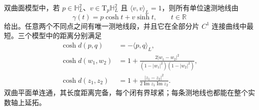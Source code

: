 \begin{theorem}
	\label{g1:thm:hyperbolic-distance-geodesics}
	双曲面模型中，若 \(p\in\mathbb H_L^2\)、\(v\in \mathrm{T}_p\mathbb H_L^2\) 且 \(\langle v,v\rangle_L=1\)，则所有单位速测地线由
	\begin{equation}
		\label{g1:eq:hyperboloid-geodesic}
		\gamma(t)=p\cosh t+v\sinh t,\qquad t\in\mathbb R
	\end{equation}
	给出。任意两个不同点之间有唯一测地线段，并且它在全部分片 \(C^1\) 连接曲线中最短。三个模型中的距离分别满足
	\begin{align}
		\cosh d(p,q)&=-\langle p,q\rangle_L,
		\label{g1:eq:hyperboloid-distance}\\
		\cosh d(w_1,w_2)&=1+\frac{2|w_1-w_2|^2}{(1-|w_1|^2)(1-|w_2|^2)},
		\label{g1:eq:disc-distance}\\
		\cosh d(z_1,z_2)&=1+\frac{|z_1-z_2|^2}{2\operatorname{Im}z_1\operatorname{Im}z_2}.
		\label{g1:eq:half-plane-distance}
	\end{align}
	双曲平面单连通，其长度距离完备，每个闭有界球紧；每条测地线也都能在整个实数轴上延拓。
\end{theorem}
